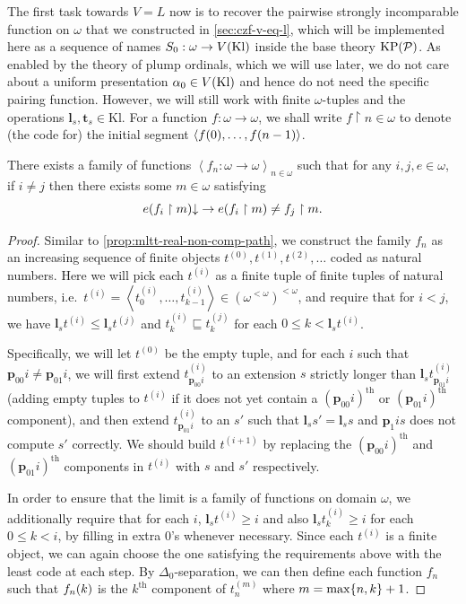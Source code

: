 \documentclass[12pt,openany]{book}
\theoremstyle{plain}
\theoremstyle{definition}
\newcommand\tuple[1]{\left\langle #1 \right\rangle}
\newcommand\Pow{\mathcal{P}}
\newcommand\KPP{\mathrm{KP}\mleft(\Pow\mright)}
\newcommand\Kl{\mathrm{Kl}}
\newcommand\bp{\mathbf{p}}
\newcommand\bl{\mathbf{l}}
\newcommand\bt{\mathbf{t}}
\begin{document}
The first task towards $V = L$ now is to recover the pairwise strongly incomparable function on $\omega$ that we constructed in \autoref{sec:czf-v-eq-l}, which will be implemented here as a sequence of names $S_0 : \omega \rightarrow V\mleft(\Kl\mright)$ inside the base theory $\KPP$. As enabled by the theory of plump ordinals, which we will use later, we do not care about a uniform presentation $\alpha_0 \in V\mleft(\Kl\mright)$ and hence do not need the specific pairing function. However, we will still work with finite $\omega$-tuples and the operations $\bl_s, \bt_s \in \Kl$. For a function $f : \omega \rightarrow \omega$, we shall write $f \upharpoonright n \in \omega$ to denote (the code for) the initial segment $\tuple{f\mleft(0\mright), \ldots, f\mleft(n - 1\mright)}$.

\begin{proposition}
  \label{prop:kpp-non-com-omega-seq}
  There exists a family of functions $\tuple{f_n : \omega \rightarrow \omega}_{n \in \omega}$ such that for any $i, j, e \in \omega$, if $i \neq j$ then there exists some $m \in \omega$ satisfying
  \[e \mleft(f_i \upharpoonright m\mright) {\downarrow} \rightarrow e \mleft(f_i \upharpoonright m\mright) \neq f_j \upharpoonright m.\]
\end{proposition}

\begin{proof}
  Similar to \autoref{prop:mltt-real-non-comp-path}, we construct the family $f_n$ as an increasing sequence of finite objects $t^{(0)}, t^{(1)}, t^{(2)}, \ldots$ coded as natural numbers. Here we will pick each $t^{(i)}$ as a finite tuple of finite tuples of natural numbers, i.e.\ $t^{(i)} = \tuple{t^{(i)}_0, \ldots, t^{(i)}_{k - 1}} \in \left(\omega^{< \omega}\right)^{< \omega}$, and require that for $i < j$, we have $\bl_s t^{(i)} \leq \bl_s t^{(j)}$ and $t^{(i)}_k \sqsubseteq t^{(j)}_k$ for each $0 \leq k < \bl_s t^{(i)}$.

  Specifically, we will let $t^{(0)}$ be the empty tuple, and for each $i$ such that $\bp_{00} i \neq \bp_{01} i$, we will first extend $t^{(i)}_{\bp_{00} i}$ to an extension $s$ strictly longer than $\bl_s t^{(i)}_{\bp_{01} i}$ (adding empty tuples to $t^{(i)}$ if it does not yet contain a $\left(\bp_{00} i\right)^\text{th}$ or $\left(\bp_{01} i\right)^\text{th}$ component), and then extend $t^{(i)}_{\bp_{01} i}$ to an $s'$ such that $\bl_s s' = \bl_s s$ and $\bp_1 i s$ does not compute $s'$ correctly. We should build $t^{(i + 1)}$ by replacing the $\left(\bp_{00} i\right)^\text{th}$ and $\left(\bp_{01} i\right)^\text{th}$ components in $t^{(i)}$ with $s$ and $s'$ respectively.

  In order to ensure that the limit is a family of functions on domain $\omega$, we additionally require that for each $i$, $\bl_s t^{(i)} \geq i$ and also $\bl_s t^{(i)}_k \geq i$ for each $0 \leq k < i$, by filling in extra $0$'s whenever necessary. Since each $t^{(i)}$ is a finite object, we can again choose the one satisfying the requirements above with the least code at each step. By $\Delta_0$-separation, we can then define each function $f_n$ such that $f_n\mleft(k\mright)$ is the $k^\text{th}$ component of $t^{(m)}_n$ where $m = \max\mleft\{n, k\mright\} + 1$.
\end{proof}
\end{document}
